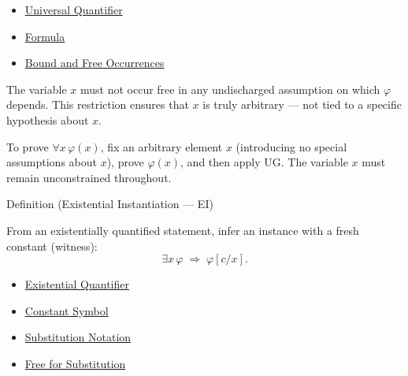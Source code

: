 \begin{dependencies}
\begin{itemize}
  \item \hyperref[def:universal-q]{Universal Quantifier}
  \item \hyperref[def:formula]{Formula}
  \item \hyperref[def:bound-free]{Bound and Free Occurrences}
\end{itemize}
\end{dependencies}

\begin{remark*}[Restriction on UG]
The variable $x$ must not occur free in any undischarged assumption on which
$\varphi$ depends. This restriction ensures that $x$ is truly arbitrary —
not tied to a specific hypothesis about $x$.
\end{remark*}

\begin{remark*}
To prove $\forall x\,\varphi(x)$, fix an arbitrary element $x$ (introducing no
special assumptions about $x$), prove $\varphi(x)$, and then apply UG. The
variable $x$ must remain unconstrained throughout.
\end{remark*}

\begin{definitionbox}{Definition (Existential Instantiation — EI)}
\begin{definition}\label{def:ei}
From an existentially quantified statement, infer an instance with a fresh
constant (witness):
\[
\exists x\,\varphi \;\Rightarrow\; \varphi[c/x].
\]
\end{definition}
\end{definitionbox}

\begin{dependencies}
\begin{itemize}
  \item \hyperref[def:existential-q]{Existential Quantifier}
  \item \hyperref[def:constant-symbol]{Constant Symbol}
  \item \hyperref[def:subst-notation]{Substitution Notation}
  \item \hyperref[def:free-for]{Free for Substitution}
\end{itemize}
\end{dependencies}

